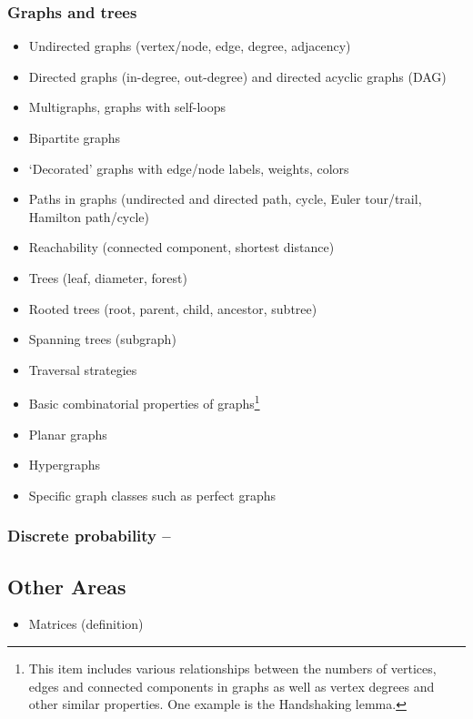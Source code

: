 \documentclass[12pt]{article}
\begin{document}
		\subsubsection{Graphs and trees}
		\begin{itemize}[label=]
			\item Undirected graphs (vertex/node, edge, degree, adjacency)
			\item Directed graphs (in-degree, out-degree) and directed acyclic graphs (DAG)
			\item Multigraphs, graphs with self-loops
			\item Bipartite graphs
			\item ‘Decorated’ graphs with edge/node labels, weights, colors
			\item Paths in graphs (undirected and directed path, cycle, Euler tour/trail, Hamilton path/cycle)
			\item Reachability (connected component, shortest distance)
			\item Trees (leaf, diameter, forest)
			\item Rooted trees (root, parent, child, ancestor, subtree)
			\item Spanning trees (subgraph)
			\item Traversal strategies
			\item Basic combinatorial properties of graphs\footnote{This item includes various relationships between the numbers of vertices, edges and connected components in graphs as well as vertex degrees and other similar properties. One example is the Handshaking lemma.}
		\end{itemize}
	
		\begin{itemize}[label=]
			\item Planar graphs
			\item Hypergraphs
			\item Specific graph classes such as perfect graphs
		\end{itemize}
			
		\subsubsection{Discrete probability – }
	
	\subsection{Other Areas}
		\begin{itemize}[label=]
			\item Matrices (definition)
		\end{itemize}
	
\end{document}

